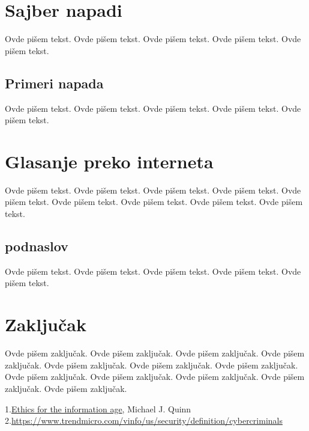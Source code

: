 \documentclass[a4paper]{article}
\begin{document}
\section{Sajber napadi}
\label{sec:sajber_napadi}

Ovde pišem tekst. 
Ovde pišem tekst. 
Ovde pišem tekst. 
Ovde pišem tekst. 
Ovde pišem tekst. 

\subsection{Primeri napada}
\label{subsec:primeri_napada}

Ovde pišem tekst. 
Ovde pišem tekst. 
Ovde pišem tekst. 
Ovde pišem tekst. 
Ovde pišem tekst. 


\section{Glasanje preko interneta}
\label{sec:glasanje}

Ovde pišem tekst. 
Ovde pišem tekst. 
Ovde pišem tekst. 
Ovde pišem tekst. 
Ovde pišem tekst. 
Ovde pišem tekst. 
Ovde pišem tekst. 
Ovde pišem tekst. 
Ovde pišem tekst. 

\subsection{podnaslov}
\label{subsec:podnaslov}

Ovde pišem tekst. 
Ovde pišem tekst. 
Ovde pišem tekst. 
Ovde pišem tekst. 
Ovde pišem tekst.

\section{Zaključak}
\label{sec:zakljucak}

Ovde pišem zaključak. 
Ovde pišem zaključak. 
Ovde pišem zaključak. 
Ovde pišem zaključak. 
Ovde pišem zaključak. 
Ovde pišem zaključak. 
Ovde pišem zaključak. 
Ovde pišem zaključak. 
Ovde pišem zaključak. 
Ovde pišem zaključak. 
Ovde pišem zaključak. 
Ovde pišem zaključak.

 

\appendix
 

1.\href{https://staff.emu.edu.tr/mobinabeheshti/documents/courses/itec%20317/book-ethics%20for%20the%20information%20age.pdf}{Ethics for the information age}, Michael J. Quinn
2.\url{https://www.trendmicro.com/vinfo/us/security/definition/cybercriminals}
\end{document}
